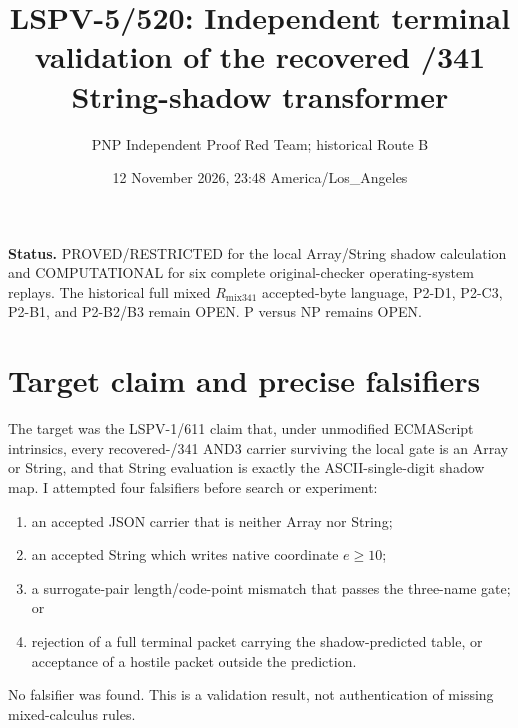 \documentclass[11pt]{article}
\title{LSPV-5/520: Independent terminal validation of the recovered /341 String-shadow transformer}
\author{PNP Independent Proof Red Team; historical Route B}
\date{12 November 2026, 23:48 America/Los\_Angeles}
\begin{document}
\maketitle

\noindent\textbf{Status.} PROVED/RESTRICTED for the local Array/String shadow calculation and COMPUTATIONAL for six complete original-checker operating-system replays.  The historical full mixed $R_{\mathrm{mix341}}$ accepted-byte language, P2-D1, P2-C3, P2-B1, and P2-B2/B3 remain OPEN.  P versus NP remains OPEN.

\section{Target claim and precise falsifiers}
The target was the LSPV-1/611 claim that, under unmodified ECMAScript intrinsics, every recovered-/341 AND3 carrier surviving the local gate is an Array or String, and that String evaluation is exactly the ASCII-single-digit shadow map.  I attempted four falsifiers before search or experiment:
\begin{enumerate}
\item an accepted JSON carrier that is neither Array nor String;
\item an accepted String which writes native coordinate $e\geq 10$;
\item a surrogate-pair length/code-point mismatch that passes the three-name gate; or
\item rejection of a full terminal packet carrying the shadow-predicted table, or acceptance of a hostile packet outside the prediction.
\end{enumerate}
No falsifier was found.  This is a validation result, not authentication of missing mixed-calculus rules.
\end{document}
